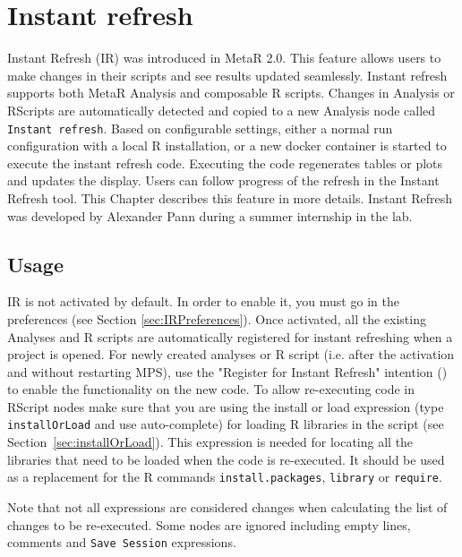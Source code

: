 

\chapter{Instant refresh}\label{chap:InstantRefresh}
Instant Refresh (IR) was introduced in MetaR 2.0. This feature allows users to make changes in their scripts and see results updated seamlessly. Instant refresh supports both MetaR Analysis and composable R scripts.  
Changes in Analysis or RScripts are automatically detected and copied to a new Analysis node called \texttt{Instant refresh}. Based on configurable settings, either a normal run configuration with a local R installation, or a new docker container is started to execute the instant refresh code. Executing the code regenerates tables or plots and updates the display. Users can follow progress of the refresh in the Instant Refresh tool. This Chapter describes this feature in more details. Instant Refresh was developed by Alexander Pann during a summer internship in the lab.

\section{Usage}
IR is not activated by default. In order to enable it, you must go in the preferences (see Section \ref{sec:IRPreferences}). Once activated, all the existing Analyses and R scripts are automatically registered for instant refreshing when a project is opened. For newly created analyses or R script (i.e. after the activation and without restarting MPS), use the "Register for Instant Refresh" intention (\intentionLightBulb) to enable the functionality on the new code.  
To allow re-executing code in RScript nodes make sure that you are using
the install or load expression (type \texttt{installOrLoad} and use auto-complete) for loading R libraries in the script (see Section~\ref{sec:installOrLoad}). This expression is needed for locating all the libraries
that need to be loaded when the code is re-executed. It should be used as a
replacement for the R commands \texttt{install.packages}, \texttt{library} or \texttt{require}.

\begin{remark}
Note that not all expressions are considered changes when calculating the list of changes to be re-executed. Some nodes are ignored including empty lines, comments and \texttt{Save Session} expressions.
\end{remark}

